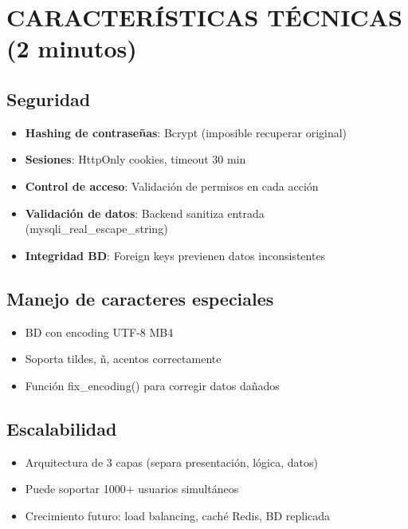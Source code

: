 \documentclass[12pt, a4paper, spanish]{article}
\begin{document}
\section{CARACTERÍSTICAS TÉCNICAS (2 minutos)}

\subsection{Seguridad}

\begin{itemize}
    \item \textbf{Hashing de contraseñas}: Bcrypt (imposible recuperar original)
    \item \textbf{Sesiones}: HttpOnly cookies, timeout 30 min
    \item \textbf{Control de acceso}: Validación de permisos en cada acción
    \item \textbf{Validación de datos}: Backend sanitiza entrada (mysqli\_real\_escape\_string)
    \item \textbf{Integridad BD}: Foreign keys previenen datos inconsistentes
\end{itemize}

\subsection{Manejo de caracteres especiales}

\begin{itemize}
    \item BD con encoding UTF-8 MB4
    \item Soporta tildes, ñ, acentos correctamente
    \item Función fix\_encoding() para corregir datos dañados
\end{itemize}

\subsection{Escalabilidad}

\begin{itemize}
    \item Arquitectura de 3 capas (separa presentación, lógica, datos)
    \item Puede soportar 1000+ usuarios simultáneos
    \item Crecimiento futuro: load balancing, caché Redis, BD replicada
\end{itemize}

\newpage
\end{document}
